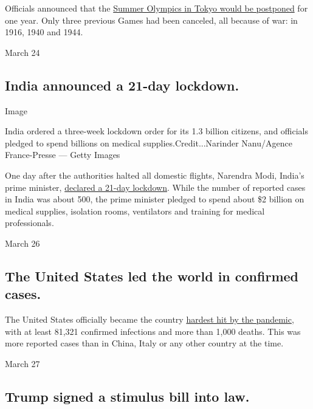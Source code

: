 Officials announced that the
\href{https://www.nytimes3xbfgragh.onion/2020/03/24/sports/olympics/coronavirus-summer-olympics-postponed.html}{Summer
Olympics in Tokyo would be postponed} for one year. Only three previous
Games had been canceled, all because of war: in 1916, 1940 and 1944.

March 24

\hypertarget{india-announced-a-21-day-lockdown}{%
\subsection{India announced a 21-day
lockdown.}\label{india-announced-a-21-day-lockdown}}

Image

India ordered a three-week lockdown order for its 1.3 billion citizens,
and officials pledged to spend billions on medical
supplies.Credit...Narinder Nanu/Agence France-Presse --- Getty Images

One day after the authorities halted all domestic flights, Narendra
Modi, India's prime minister,
\href{https://www.nytimes3xbfgragh.onion/2020/03/24/world/asia/india-coronavirus-lockdown.html}{declared
a 21-day lockdown}. While the number of reported cases in India was
about 500, the prime minister pledged to spend about \$2 billion on
medical supplies, isolation rooms, ventilators and training for medical
professionals.

March 26

\hypertarget{the-united-states-led-the-world-in-confirmed-cases}{%
\subsection{The United States led the world in confirmed
cases.}\label{the-united-states-led-the-world-in-confirmed-cases}}

The United States officially became the country
\href{https://www.nytimes3xbfgragh.onion/2020/03/26/health/usa-coronavirus-cases.html}{hardest
hit by the pandemic}, with at least 81,321 confirmed infections and more
than 1,000 deaths. This was more reported cases than in China, Italy or
any other country at the time.

March 27

\hypertarget{trump-signed-a-stimulus-bill-into-law}{%
\subsection{Trump signed a stimulus bill into
law.}\label{trump-signed-a-stimulus-bill-into-law}}

